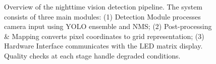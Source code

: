 \documentclass[11pt]{article}
\begin{document}
\begin{figure}[H]
    \caption{Overview of the nighttime vision detection pipeline. The system consists of three main modules: (1) Detection Module processes camera input using YOLO ensemble and NMS; (2) Post-processing \& Mapping converts pixel coordinates to grid representation; (3) Hardware Interface communicates with the LED matrix display. Quality checks at each stage handle degraded conditions.}
    \label{fig:detection_pipeline}
    \end{figure}

    
\end{document}

